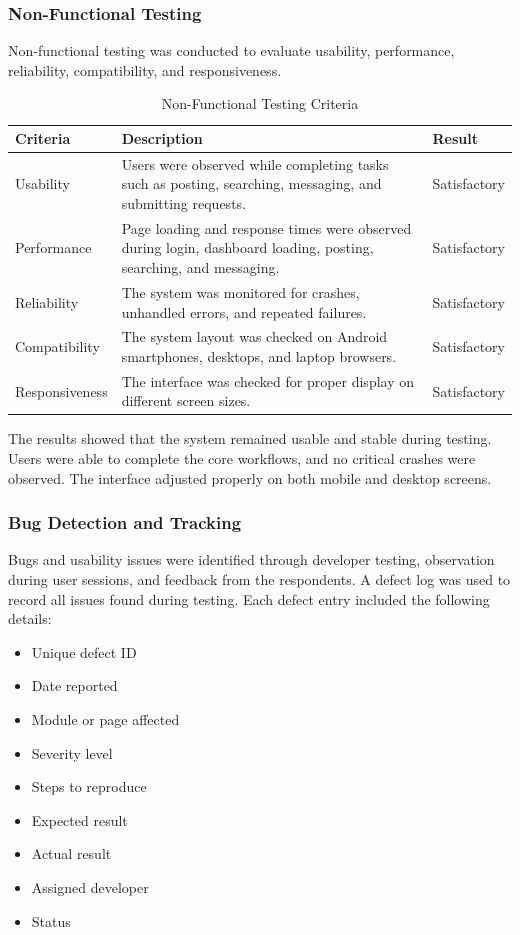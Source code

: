 \subsubsection{Non-Functional Testing}

Non-functional testing was conducted to evaluate usability, performance, reliability, compatibility, and responsiveness.

\begin{table}[H]
\centering
\caption{Non-Functional Testing Criteria}
\begin{tabular}{p{4cm}p{7cm}p{3cm}}
\hline
\textbf{Criteria} & \textbf{Description} & \textbf{Result} \\
\hline
Usability & Users were observed while completing tasks such as posting, searching, messaging, and submitting requests. & Satisfactory \\
Performance & Page loading and response times were observed during login, dashboard loading, posting, searching, and messaging. & Satisfactory \\
Reliability & The system was monitored for crashes, unhandled errors, and repeated failures. & Satisfactory \\
Compatibility & The system layout was checked on Android smartphones, desktops, and laptop browsers. & Satisfactory \\
Responsiveness & The interface was checked for proper display on different screen sizes. & Satisfactory \\
\hline
\end{tabular}
\end{table}

The results showed that the system remained usable and stable during testing. Users were able to complete the core workflows, and no critical crashes were observed. The interface adjusted properly on both mobile and desktop screens.

\subsubsection{Bug Detection and Tracking}

Bugs and usability issues were identified through developer testing, observation during user sessions, and feedback from the respondents. A defect log was used to record all issues found during testing. Each defect entry included the following details:

\begin{itemize}
    \item Unique defect ID
    \item Date reported
    \item Module or page affected
    \item Severity level
    \item Steps to reproduce
    \item Expected result
    \item Actual result
    \item Assigned developer
    \item Status
\end{itemize}

